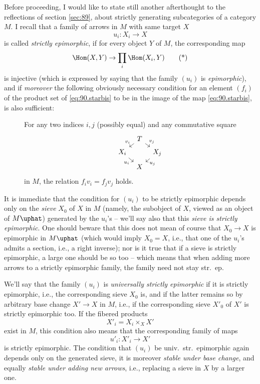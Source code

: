 \starsbreak

Before proceeding, I would like to state still another afterthought to
the reflections of section \ref{sec:89}, about strictly generating
subcategories of a category $M$. I recall that a family of arrows in
$M$ with same target $X$
\[u_i:X_i\to X\]
is called \emph{strictly epimorphic}, if for every object $Y$ of $M$,
the corresponding map
\begin{equation}
  \label{eq:90.starbis}
  \Hom(X,Y) \to \prod_i\Hom(X_i,Y)\tag{*}
\end{equation}
is injective (which is expressed by saying that the family $(u_i)$ is
\emph{epimorphic}), and if \emph{moreover} the following obviously
necessary condition for an element $(f_i)$ of the product set of
\eqref{eq:90.starbis} to be in the image of the map \eqref{eq:90.starbis},
is also sufficient:
\begin{description}
\item[]
  For any two indices $i,j$ (possibly equal) and any commutative
  square
  \[\begin{tikzcd}[sep=tiny]
    & T\ar[dl,"v_i"']\ar[dr,"v_j"] & \\
    X_i\ar[dr,"u_i"'] & & X_j\ar[dl,"u_j"] \\
    & X &
  \end{tikzcd}\]
  in $M$, the relation $f_iv_i=f_jv_j$ holds.
\end{description}
It is immediate that the condition for $(u_i)$ to be strictly
epimorphic depends only on the \emph{sieve} $X_0$ of $X$
in $M$ (namely, the subobject of $X$, viewed as an object of
$M\uphat$) generated by the $u_i$'s -- we'll say also that this
\emph{sieve is strictly epimorphic}. One should beware that this does
not mean of course that $X_0\to X$ is epimorphic in $M\uphat$ (which
would imply $X_0=X$, i.e., that one of the $u_i$'s admits a section,
i.e., a right inverse); nor is it true that if a sieve is strictly
epimorphic, a large one should be so too -- which means that when
adding more arrows to a strictly epimorphic family, the family need
not stay str.\ ep.

We'll say that the family $(u_i)$ is \emph{universally strictly
  epimorphic} if it is strictly epimorphic, i.e., the corresponding
sieve $X_0$ is, and if the latter remains so by arbitrary base change
$X'\to X$ in $M$, i.e., if the corresponding sieve $X'_0$ of $X'$ is
strictly epimorphic too. If the fibered products
\[X'_i = X_i\times_X X'\]
exist in $M$, this condition also means that the corresponding family
of maps
\[ u'_i:X'_i\to X'\]
is strictly epimorphic. The condition that $(u_i)$ be univ.\ str.\
epimorphic again depends only on the generated sieve, it is moreover
\emph{stable under base change}, and equally \emph{stable under adding
  new arrows}, i.e., replacing a sieve in $X$ by a larger one.

